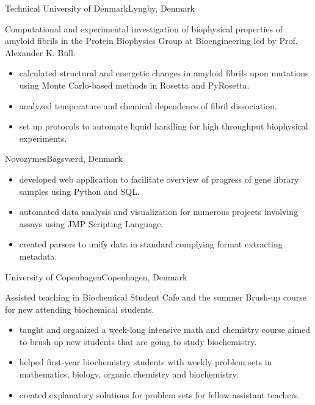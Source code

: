 \documentclass{cleancv}
\begin{document}
\begin{expsec}

  {Technical University of Denmark}{Lyngby, Denmark}%
  {%
    Computational and experimental investigation of biophysical
    properties of amyloid fibrils in the Protein Biophysics Group at
    Bioengineering led by Prof. Alexander K. Büll.

    \begin{itemize}
    \item calculated structural and energetic changes in amyloid
      fibrils upon mutations using Monte Carlo-based methods in
      Rosetta and PyRosetta.

    \item analyzed temperature and chemical dependence of fibril
      dissociation.

    \item set up protocols to automate liquid handling for high
      throughput biophysical experiments.

    \end{itemize}
  }

  {Novozymes}{Bagsværd, Denmark}%
  {%
    \begin{itemize}
    \item developed web application to facilitate overview of
      progress of gene library samples using Python and SQL.
    \item automated data analysis and visualization for numerous
      projects involving assays using JMP Scripting Language.
    \item created parsers to unify data in standard complying format
      extracting metadata.
    \end{itemize}
  }
  {University of Copenhagen}{Copenhagen, Denmark}%
  {%
    Assisted teaching in Biochemical Student Cafe and the summer
    Brush-up course for new attending biochemical students.

    \begin{itemize}
    \item taught and organized a week-long intensive math and
      chemistry course aimed to brush-up new students that are going
      to study biochemistry.
    \item helped first-year biochemistry students with weekly problem
      sets in mathematics, biology, organic chemistry and
      biochemistry.
    \item created explanatory solutions for problem sets for fellow
      assistant teachers.
    \end{itemize}
  }

\end{expsec} 
\end{document}
